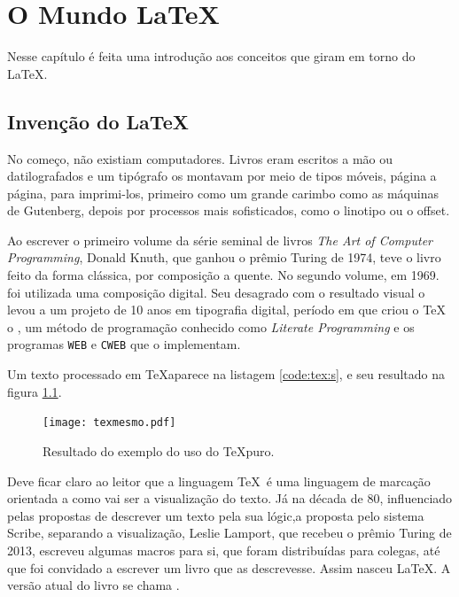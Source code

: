 \chapter{O Mundo \LaTeX}
\label{chap:mundo}

Nesse capítulo é feita uma introdução aos conceitos que giram em torno do \LaTeX.

\section{Invenção do \LaTeX}

No começo, não existiam computadores. Livros eram escritos a mão ou datilografados e um tipógrafo os montavam por meio de tipos móveis, página a página, para imprimi-los, primeiro como um grande carimbo como as máquinas de Gutenberg, depois por processos mais sofisticados, como o linotipo ou o offset.

Ao escrever o primeiro volume da série seminal de livros \textit{The Art of Computer Programming}, Donald Knuth, que ganhou o prêmio Turing de 1974, teve o livro feito da forma clássica, por composição a quente. No segundo volume, em 1969. foi utilizada uma composição digital. Seu desagrado com o resultado visual o levou a um projeto de 10 anos em tipografia digital, período em que criou o \TeX\, o , um método de programação conhecido como \textit{Literate Programming} e os programas \texttt{WEB} e \texttt{CWEB} que o implementam.




Um texto processado em \TeX aparece na listagem \ref{code:tex:s}, e seu resultado na figura \ref{fig:texmesmo}.





\begin{figure}[hbt]
    \centering
    \texttt{[image: texmesmo.pdf]}
    \caption[Resultado do exemplo do uso do \TeX puro.]{Resultado do exemplo do uso do \TeX puro.}
    \label{fig:texmesmo}
\end{figure}

Deve ficar claro ao leitor que a linguagem \TeX\ é uma linguagem de marcação orientada a como vai ser a visualização do texto. Já na década de 80,  influenciado pelas propostas de descrever um texto pela sua lógic,a proposta pelo sistema Scribe\parencite{Reid:1980}, separando a visualização, Leslie Lamport, que recebeu o prêmio Turing de 2013, escreveu algumas macros para si, que foram distribuídas para colegas, até que foi convidado a escrever um livro que as descrevesse. Assim nasceu \LaTeX\parencite{Mittelbach:1999}. A versão atual do livro se chama \parencite{latex:userguide}.


